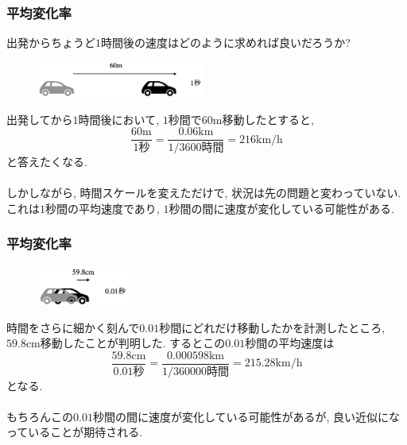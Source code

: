 \begin{frame}
\frametitle{平均変化率}

出発からちょうど$1$時間後の速度はどのように求めれば良いだろうか? 

\vspace{-2mm}

 \begin{figure}[htbp]
 \begin{center} 
  \includegraphics[width=55mm]{calculus4/60m.png}
 \end{center}
\end{figure}

\vspace{-2mm}

出発してから$1$時間後において, $1$秒間で$60$m移動したとすると, 
$$
\frac{\text{$60$m}}{\text{$1$秒}}=
\frac{\text{$0.06$km}}{\text{$1/3600$時間}}=216\text{km/h}
$$
と答えたくなる. \\
\ \\

しかしながら, 時間スケールを変えただけで, 状況は先の問題と変わっていない. 
これは$1$秒間の平均速度であり, 
$1$秒間の間に速度が変化している可能性がある. 


\end{frame}






\begin{frame}
\frametitle{平均変化率}

\vspace{-10mm}

 \begin{figure}[htbp]
 \begin{center} 
  \includegraphics[width=30mm]{calculus4/59cm.png}
 \end{center}
\end{figure}

\vspace{-2mm}

時間をさらに細かく刻んで$0.01$秒間にどれだけ移動したかを計測したところ, $59.8$cm移動したことが判明した. 
するとこの$0.01$秒間の平均速度は
$$
\frac{\text{$59.8$cm}}{\text{$0.01$秒}}=
\frac{\text{$0.000598$km}}{\text{$1/360000$時間}}=215.28\text{km/h}
$$
となる. \\
\ \\

もちろんこの$0.01$秒間の間に速度が変化している可能性があるが, 良い近似になっていることが期待される.  


\end{frame}



